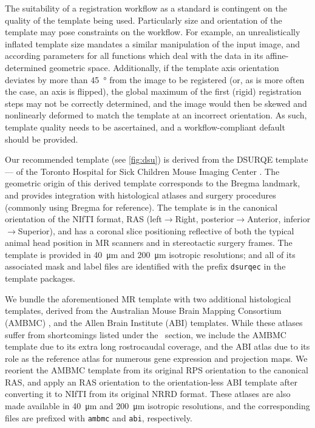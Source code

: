 The suitability of a registration workflow as a standard is contingent on the quality of the template being used.
Particularly size and orientation of the template may pose constraints on the workflow.
For example, an unrealistically inflated template size mandates a similar manipulation of the input image, and according parameters for all functions which deal with the data in its affine-determined geometric space.
Additionally, if the template axis orientation deviates by more than \SI{45}{\degree} from the image to be registered (or, as is more often the case, an axis is flipped), the global maximum of the first (rigid) registration steps may not be correctly determined, and the image would then be skewed and nonlinearly deformed to match  the template at an incorrect orientation.
As such, template quality needs to be ascertained, and a workflow-compliant default should be provided.

Our recommended template (see \cref{fig:dsu}) is derived from the DSURQE template --- of the Toronto Hospital for Sick Children Mouse Imaging Center \cite{dsu}.
The geometric origin of this derived template corresponds to the Bregma landmark, and provides integration with histological atlases and surgery procedures (commonly using Bregma for reference).
The template is in the canonical orientation of the NIfTI format, RAS (left$\rightarrow$Right, posterior$\rightarrow$Anterior, inferior$\rightarrow$Superior), and has a coronal slice positioning reflective of both the typical animal head position in MR scanners and in stereotactic surgery frames.
The template is provided in \SI{40}{\micro\meter} and \SI{200}{\micro\meter} isotropic resolutions; 
and all of its associated mask and label files are identified with the prefix \textcolor{mg}{\texttt{dsurqec}} in the template packages.

We bundle the aforementioned MR template with two additional histological templates, derived from the Australian Mouse Brain Mapping Consortium (AMBMC) \cite{amb}, and the Allen Brain Institute (ABI) \cite{abi} templates.
While these atlases suffer from shortcomings listed under the ~section, we include the AMBMC template due to its extra long rostrocaudal coverage, and the ABI atlas due to its role as the reference atlas for numerous gene expression and projection maps.
We reorient the AMBMC template from its original RPS orientation to the canonical RAS, and apply an RAS orientation to the orientation-less ABI template after converting it to NIfTI from its original NRRD format.
These atlases are also made available in \SI{40}{\micro\meter} and \SI{200}{\micro\meter} isotropic resolutions, and the corresponding files are prefixed with \textcolor{mg}{\texttt{ambmc}} and \textcolor{mg}{\texttt{abi}}, respectively.

